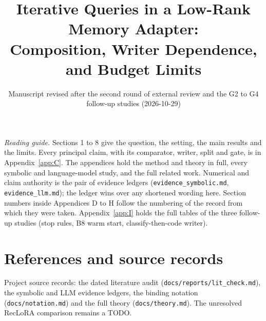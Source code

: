 \documentclass[10pt,a4paper]{article}
\title{Iterative Queries in a Low-Rank Memory Adapter:\\Composition, Writer Dependence, and Budget Limits}
\author{}
\date{Manuscript revised after the second round of external review and the G2 to G4 follow-up studies (2026-10-29)}
\begin{document}
\maketitle

\begin{abstract}

\end{abstract}

\noindent\small\emph{Reading guide.}
Sections 1 to 8 give the question, the setting, the main results and the limits.
Every principal claim, with its comparator, writer, split and gate, is in Appendix~\ref{app:C}.
The appendices hold the method and theory in full, every symbolic and language-model study, and the full related work.
Numerical and claim authority is the pair of evidence ledgers (\texttt{evidence\_symbolic.md}, \texttt{evidence\_llm.md}); the ledger wins over any shortened wording here.
Section numbers inside Appendices D to H follow the numbering of the record from which they were taken.
Appendix~\ref{app:I} holds the full tables of the three follow-up studies (stop rules, B8 warm start, classify-then-code writer).
\normalsize

\tableofcontents











\appendix










\section*{References and source records}
Project source records: the dated literature audit (\texttt{docs/reports/lit\_check.md}), the symbolic and LLM evidence ledgers, the binding notation (\texttt{docs/notation.md}) and the full theory (\texttt{docs/theory.md}).
The unresolved RecLoRA comparison remains a TODO.
\nocite{*}
{\small


}
\end{document}
